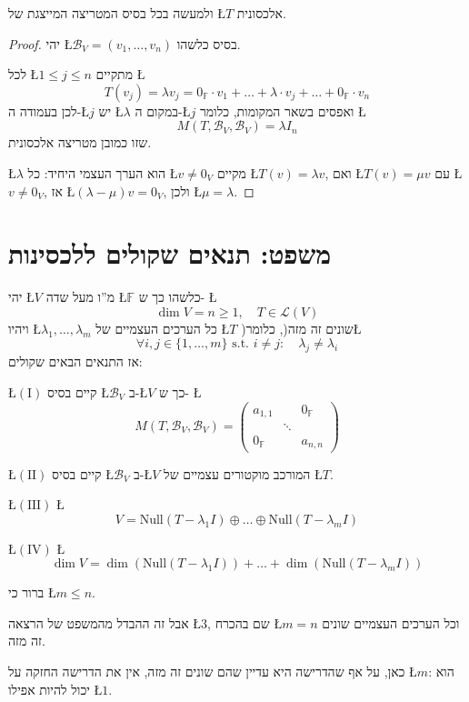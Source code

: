 \documentclass[english,hebrew]{article}
\begin{document}
ולמעשה בכל בסיס המטריצה המייצגת של \L{$T$} אלכסונית.
\begin{proof}
יהי \L{$\mathcal{B}_{V}=(v_{1},\dots,v_{n})$} בסיס כלשהו.

לכל \L{$1\le j\le n$} מתקיים \L{%
\[
T(v_{j})=\lambda v_{j}=0_{\mathbb{F}}\cdot v_{1}+\dots+\lambda\cdot v_{j}+\dots+0_{\mathbb{F}}\cdot v_{n}
\]
}%
לכן בעמודה ה-\L{$j$} יש \L{$\lambda$} במקום ה-\L{$j$} ואפסים בשאר
המקומות, כלומר \L{%
\[
M(T,\mathcal{B}_{V},\mathcal{B}_{V})=\lambda I_{n}
\]
}%
שזו כמובן מטריצה אלכסונית.

\L{$\lambda$} הוא הערך העצמי היחיד: כל \L{$v\neq0_{V}$} מקיים \L{$T(v)=\lambda v$},
ואם \L{$T(v)=\mu v$} עם \L{$v\neq0_{V}$}, אז \L{$(\lambda-\mu)v=0_{V}$},
ולכן \L{$\mu=\lambda$}. 
\end{proof}

\section{משפט: תנאים שקולים ללכסינות}

יהי \L{$V$} מ\textquotedblright ו מעל שדה \L{$\mathbb{F}$} כלשהו
כך ש- \L{%
\[
\dim V=n\geq1,\quad T\in\mathcal{L}(V)
\]
}%
ויהיו \L{$\lambda_{1},\dots,\lambda_{m}$} כל הערכים העצמיים של \L{$T$}
)שונים זה מזה(, כלומר\L{%
\[
\forall i,j\in\{1,\dots,m\}\text{ s.t. }i\neq j:\quad\lambda_{j}\neq\lambda_{i}
\]
}%
אז התנאים הבאים שקולים:

\L{$(\text{I})$} קיים בסיס \L{$\mathcal{B}_{V}$} ב-\L{$V$} כך ש-
\L{%
\[
M(T,\mathcal{B}_{V},\mathcal{B}_{V})=\begin{pmatrix}a_{1,1} &  & 0_{\mathbb{F}}\\
 & \ddots\\
0_{\mathbb{F}} &  & a_{n,n}
\end{pmatrix}
\]
}%

\L{$(\text{II})$} קיים בסיס \L{$\mathcal{B}_{V}$} ב-\L{$V$} המורכב
מוקטורים עצמיים של \L{$T$}.

\L{$(\text{III})$} \L{%
\[
V=\text{Null}(T-\lambda_{1}I)\oplus\dots\oplus\text{Null}(T-\lambda_{m}I)
\]
}%

\L{$(\text{IV})$} \L{%
\[
\dim V=\dim\left(\text{Null}(T-\lambda_{1}I)\right)+\dots+\dim\left(\text{Null}(T-\lambda_{m}I)\right)
\]
}%

ברור כי \L{$m\leq n$}.

אבל זה ההבדל מהמשפט של הרצאה \L{$3$}, שם בהכרח \L{$m=n$} וכל הערכים
העצמיים שונים זה מזה.

כאן, על אף שהדרישה היא עדיין שהם שונים זה מזה, אין את הדרישה החזקה
על \L{$m$}: הוא יכול להיות אפילו \L{$1$}.
\end{document}
